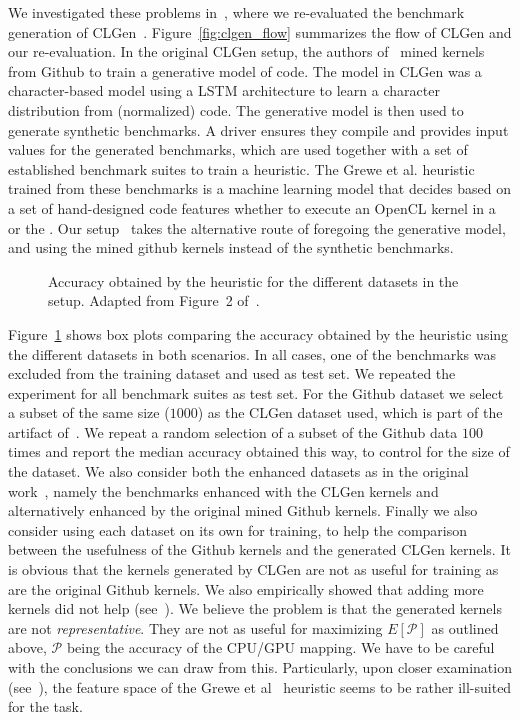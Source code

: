 We investigated these problems in~\cite{goens_mapl19}, where we re-evaluated the benchmark generation of CLGen~\cite{cummins_cgo2017}.
Figure~\ref{fig:clgen_flow} summarizes the flow of CLGen and our re-evaluation.
In the original CLGen setup, the authors of~\cite{cummins_cgo2017} mined kernels from Github to train a generative model of code.
The model in CLGen was a character-based model using a \ac{LSTM}\cite{lstm} architecture to learn a character distribution from (normalized) code.
The generative model is then used to generate synthetic benchmarks. A driver ensures they compile and provides input values for the generated benchmarks, which are used together with a set of established benchmark suites to train a heuristic.
The Grewe et al. heuristic~\cite{grewe_cgo13} trained from these benchmarks is a machine learning model that decides based on a set of hand-designed code features whether to execute an OpenCL kernel in a  or the . 
Our setup~\cite{goens_mapl19} takes the alternative route of foregoing the generative model, and using the mined github kernels instead of the synthetic benchmarks.

\begin{figure}[h]
	\centering
\resizebox{0.95\textwidth}{!}{
     
     }
   \caption{Accuracy obtained by the heuristic for the different datasets in the setup. Adapted from Figure~2 of~\cite{goens_mapl19}.}
   \label{fig:clgen_accuracy}
\end{figure}

Figure~\ref{fig:clgen_accuracy} shows box plots comparing the accuracy obtained by the heuristic using the different datasets in both scenarios.
In all cases, one of the benchmarks was excluded from the training dataset and used as test set. We repeated the experiment for all benchmark suites as test set.
For the Github dataset we select a subset of the same size ($1000$) as the CLGen dataset used, which is part of the artifact of~\cite{cummins_cgo2017}.
We repeat a random selection of a subset of the Github data $100$ times and report the median accuracy obtained this way, to control for the size of the dataset.
We also consider both the enhanced datasets as in the original work~\cite{cummins_cgo2017}, namely the benchmarks enhanced with the CLGen kernels and alternatively enhanced by the original mined Github kernels.
Finally we also consider using each dataset on its own for training, to help the comparison between the usefulness of the Github kernels and the generated CLGen kernels. 
It is obvious that the kernels generated by CLGen are not as useful for training as are the original Github kernels.
We also empirically showed that adding more kernels did not help (see~\cite{goens_mapl19}).
We believe the problem is that the generated kernels are not \emph{representative}.
They are not as useful for maximizing $E[\mathcal{P}]$ as outlined above, $\mathcal{P}$ being the accuracy of the \ac{CPU}/\ac{GPU} mapping.
We have to be careful with the conclusions we can draw from this.
Particularly, upon closer examination (see~\cite{goens_mapl19}), the feature space of the Grewe et al~\cite{grewe_cgo13} heuristic seems to be rather ill-suited for the task.

